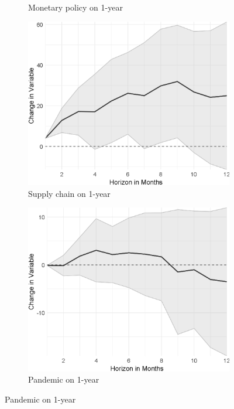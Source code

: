 \begin{figure}[H]
\begin{subfigure}{00.32\textwidth}
	\caption{Monetary policy on 1-year}
\end{subfigure}
\begin{subfigure}{00.32\textwidth}
	\includegraphics[width=1\textwidth]{output/lp/baseline/level/supply_chain/supply_chainonexpectations1y_djn.eps}
	\caption{Supply chain on 1-year}
\end{subfigure}
\begin{subfigure}{00.32\textwidth}
	\includegraphics[width=1\textwidth]{output/lp/baseline/level/pandemic/pandemiconexpectations1y_djn.eps}
	\caption{Pandemic on 1-year}
\end{subfigure}

\end{figure}
